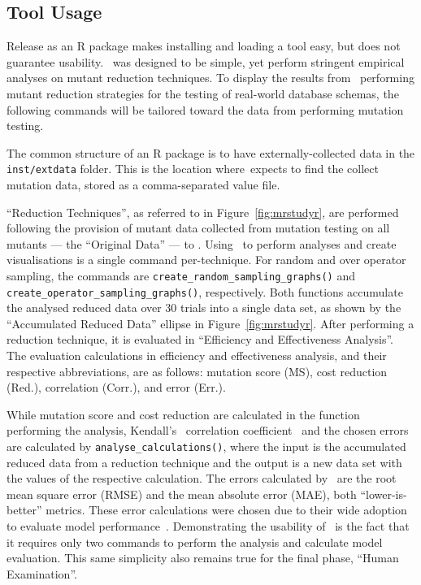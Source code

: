 \subsection{Tool Usage}



Release as an R package makes installing and loading a tool easy, but does not guarantee usability.
\mr~was designed to be simple, yet perform stringent empirical analyses on mutant reduction techniques.
To display the results from \mr~performing mutant reduction strategies for the testing of real-world
database schemas, the following commands will be tailored toward the data from performing mutation
testing.

The common structure of an R package is to have externally-collected data in the \texttt{inst/extdata}
folder. This is the location where~\mr expects to find the collect mutation data, stored as a
comma-separated value file.

``Reduction Techniques'', as referred to in Figure~\ref{fig:mrstudyr}, are performed following the
provision of mutant data collected from mutation testing on all mutants --- the ``Original Data'' ---
to \mr. Using \mr~to perform analyses and create visualisations is a single command per-technique.
For random and over operator sampling, the commands are {\texttt{create\_random\_sampling\_graphs()}}
and {\texttt{create\_operator\_sampling\_graphs()}}, respectively. Both functions accumulate the analysed
reduced data over 30 trials into a single data set, as shown by the ``Accumulated Reduced Data'' ellipse
in Figure~\ref{fig:mrstudyr}. After performing a reduction technique, it is evaluated in ``Efficiency and
Effectiveness Analysis''. The evaluation calculations in efficiency and effectiveness analysis, and their
respective abbreviations, are as follows: mutation score (MS), cost reduction (Red.), correlation (Corr.),
and error (Err.).


While mutation score and cost reduction are calculated in the function performing the analysis, Kendall's
\taub~correlation coefficient~\cite{mcminn2016virtual} and the chosen errors are calculated by
\texttt{analyse\_calculations()}, where the input is the accumulated reduced data from a reduction technique
and the output is a new data set with the values of the respective calculation.  The errors calculated by
\mr~are the root mean square error (RMSE) and the mean absolute error (MAE), both ``lower-is-better'' metrics.
These error calculations were chosen due to their wide adoption to evaluate model performance~\cite{chai2014root}.
Demonstrating the usability of \mr~is the fact that it requires only two commands to perform the analysis and
calculate model evaluation. This same simplicity also remains true for the final phase, ``Human Examination''.

